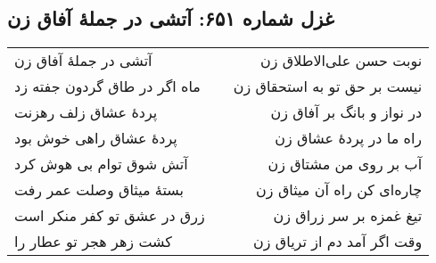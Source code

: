 \begin{center}
\section*{غزل شماره ۶۵۱: آتشی در جملهٔ آفاق زن}
\label{sec:651}
\begin{longtable}{l p{0.5cm} r}
آتشی در جملهٔ آفاق زن
&&
نوبت حسن علی‌الاطلاق زن
\\
ماه اگر در طاق گردون جفته زد
&&
نیست بر حق تو به استحقاق زن
\\
پردهٔ عشاق زلف رهزنت
&&
در نواز و بانگ بر آفاق زن
\\
پردهٔ عشاق راهی خوش بود
&&
راه ما در پردهٔ عشاق زن
\\
آتش شوق توام بی هوش کرد
&&
آب بر روی من مشتاق زن
\\
بستهٔ میثاق وصلت عمر رفت
&&
چاره‌ای کن راه آن میثاق زن
\\
زرق در عشق تو کفر منکر است
&&
تیغ غمزه بر سر زراق زن
\\
کشت زهر هجر تو عطار را
&&
وقت اگر آمد دم از تریاق زن
\\
\end{longtable}
\end{center}
